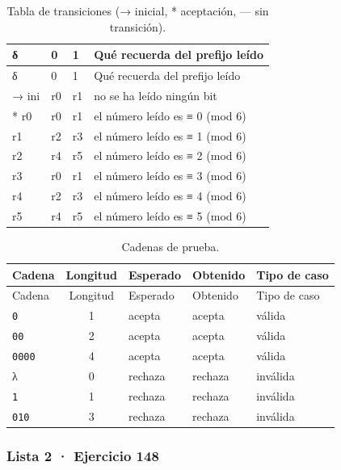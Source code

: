 \begin{longtable}[]{@{}llll@{}}
\caption{Tabla de transiciones (→ inicial, * aceptación, --- sin transición).}\tabularnewline
\toprule\noalign{}
δ & 0 & 1 & Qué recuerda del prefijo leído \\
\midrule\noalign{}
\endfirsthead
\toprule\noalign{}
δ & 0 & 1 & Qué recuerda del prefijo leído \\
\midrule\noalign{}
\endhead
\bottomrule\noalign{}
\endlastfoot
→ ini & r0 & r1 & no se ha leído ningún bit \\
* r0 & r0 & r1 & el número leído es ≡ 0 (mod 6) \\
r1 & r2 & r3 & el número leído es ≡ 1 (mod 6) \\
r2 & r4 & r5 & el número leído es ≡ 2 (mod 6) \\
r3 & r0 & r1 & el número leído es ≡ 3 (mod 6) \\
r4 & r2 & r3 & el número leído es ≡ 4 (mod 6) \\
r5 & r4 & r5 & el número leído es ≡ 5 (mod 6) \\
\end{longtable}

\begin{longtable}[]{@{}lclll@{}}
\caption{Cadenas de prueba.}\tabularnewline
\toprule\noalign{}
Cadena & Longitud & Esperado & Obtenido & Tipo de caso \\
\midrule\noalign{}
\endfirsthead
\toprule\noalign{}
Cadena & Longitud & Esperado & Obtenido & Tipo de caso \\
\midrule\noalign{}
\endhead
\bottomrule\noalign{}
\endlastfoot
\texttt{0} & 1 & acepta & acepta & válida \\
\texttt{00} & 2 & acepta & acepta & válida \\
\texttt{0000} & 4 & acepta & acepta & válida \\
λ & 0 & rechaza & rechaza & inválida \\
\texttt{1} & 1 & rechaza & rechaza & inválida \\
\texttt{010} & 3 & rechaza & rechaza & inválida \\
\end{longtable}


\hypertarget{lista-2-ejercicio-148}{%
\subsubsection{Lista 2 · Ejercicio 148}\label{lista-2-ejercicio-148}}


